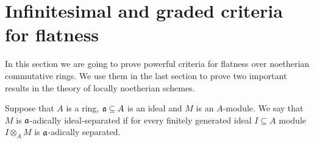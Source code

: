 \section{Infinitesimal and graded criteria for flatness}

In this section we are going to prove powerful criteria for flatness over noetherian commutative rings. We use them in the last section to prove two important results in the theory of locally noetherian schemes.

\begin{definition}
Suppose that $A$ is a ring, $\mathfrak{a}\subseteq A$ is an ideal and $M$ is an $A$-module. We say that $M$ is $\mathfrak{a}$-adically ideal-separated if for every finitely generated ideal $I\subseteq A$ module $I\otimes_AM$ is $\mathfrak{a}$-adically separated.
\end{definition}

